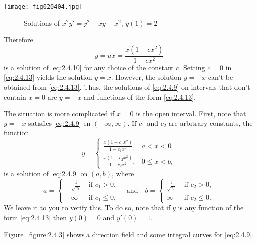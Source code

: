 \documentclass{ximera}
\begin{document}
\begin{example}
\begin{explanation}
  \begin{image}
  \texttt{[image: fig020404.jpg]}
  \end{image}
  
  \begin{center}
  \begin{figure}
\caption{Solutions of  $x^{2}y'=y^{2}+xy-x^{2}$, $y(1)=2$}
  \label{figure:2.4.4}
 \end{figure}
\end{center}

Therefore
\begin{equation} \label{eq:2.4.13}
y=ux=\frac{x(1+cx^2)}{1-cx^2}
\end{equation}
is a solution of \eqref{eq:2.4.10} for any choice of the constant $c$.
Setting $c=0$ in \eqref{eq:2.4.13} yields the solution $y=x$. However, the
solution $y=-x$ can't be obtained from \eqref{eq:2.4.13}. Thus, the
solutions of \eqref{eq:2.4.9} on intervals that don't contain $x=0$ are
$y=-x$ and functions of the form \eqref{eq:2.4.13}.

The situation is more complicated if $x=0$ is the open interval.
 First, note that $y=-x$ satisfies \eqref{eq:2.4.9}
on $(-\infty,\infty)$. If $c_1$ and $c_2$ are arbitrary constants,
 the function
\begin{equation} \label{eq:2.4.14}
y=\left\{\begin{array}{ll} \frac{x(1+c_1x^2)}{1-c_1x^2},&a<x<0,\\
\frac{x(1+c_2x^2)}{1-c_2x^2},&0\leq x<b,
 \end{array}\right.
\end{equation}
is a solution of \eqref{eq:2.4.9} on $(a,b)$, where
$$
a=\left\{\begin{array}{cl}-\frac{1}{\sqrt{c_1}}&\text{ if }c_1>0,\\
-\infty&\text{ if }c_1\leq 0,
\end{array}\right. \quad\text{and}\quad
b=\left\{\begin{array}{cl}\frac{1}{\sqrt{c_2}}&\text{ if }c_2>0,\\
\infty&\text{ if }c_2\leq 0.
\end{array}\right.
$$
We leave it to you to verify this. To do so, note that if $y$ is
any function of the form \eqref{eq:2.4.13} then $y(0)=0$ and $y'(0)=1$.


Figure~\ref{figure:2.4.3} shows a direction field and some integral curves
for \eqref{eq:2.4.9}.




\end{explanation}
\end{example}
\end{document}
